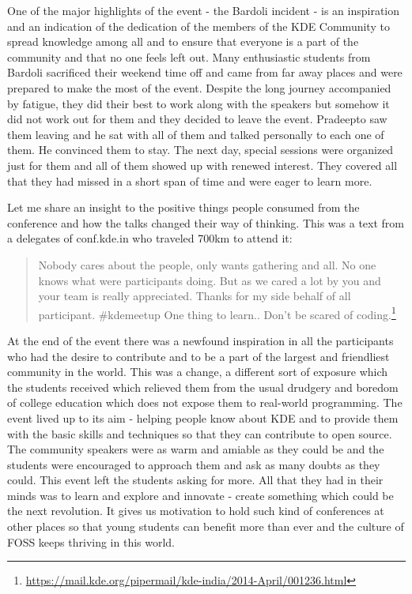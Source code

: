 One of the major highlights of the event - the Bardoli incident - is an inspiration and an indication of the dedication of the members of the KDE Community to spread knowledge among all and to ensure that everyone is a part of  the community and that no one feels left out. Many enthusiastic students from Bardoli sacrificed their weekend time off and came from far away places and were prepared to make the most of the event. Despite the long journey accompanied by fatigue, they did their best to work along with the speakers but somehow it did not work out for them and they decided to leave the event. Pradeepto saw them leaving and he sat with all of them and talked personally to each one of them. He convinced them to stay. The next day, special sessions were organized just for them and all of them showed up with renewed interest. They covered all that they had missed in a short span of time and were eager to learn more.

Let me share an insight to the positive things people consumed from the conference and how the talks changed their way of thinking. This was a text from a delegates of conf.kde.in  who traveled 700km to attend it:

\begin{quote}Nobody cares about the people, only wants gathering and all. No one knows what were participants doing. But as we cared a lot by you and your team is really appreciated. Thanks for my side behalf of all participant.
\newline
\#kdemeetup One thing to learn.. Don’t be scared of coding.\footnote{\url{https://mail.kde.org/pipermail/kde-india/2014-April/001236.html}}\end{quote}

At the end of the event there was a newfound inspiration in all the participants who had the desire to contribute and to be a part of the largest and friendliest community in the world. This was a change, a different sort of exposure which the students received which relieved them from the usual drudgery and boredom of college education which does not expose them to real-world programming. The event lived up to its aim - helping people know about KDE and to provide them with the basic skills and techniques so that they can contribute to open source. The community speakers were as warm and amiable as they could be and the students were encouraged to approach them and ask as many doubts as they could. This event left the students asking for more. All that they had in their minds was to learn and explore and innovate - create something which could be the next revolution. It gives us motivation to hold such kind of conferences at other places so that young students can benefit more than ever and the culture of FOSS keeps thriving in this world.
